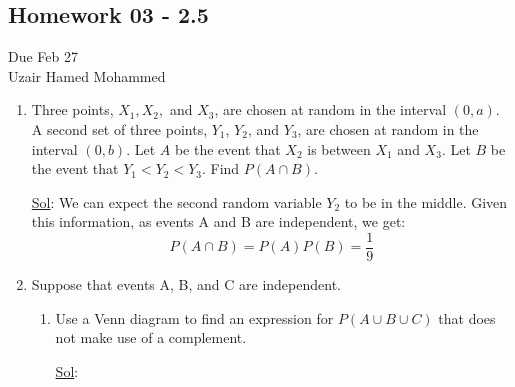 \begin{center}
  \section*{Homework 03 - 2.5}
  Due Feb 27 \\
  Uzair Hamed Mohammed
\end{center}


\begin{enumerate}
  \item[6.] Three points, \(X_1, X_2,\) and \(X_3\), are chosen at random in the
    interval $(0, a)$. A second set of three points, $Y_1$, $Y_2$, and $Y_3$,
    are chosen at random in the interval $(0, b)$. Let $A$ be the event
    that $X_2$ is between $X_1$ and $X_3$. Let $B$ be the event that
    $Y_1 < Y_2 <
    Y_3$. Find $P(A \cap B)$.

    \underline{Sol}: We can expect the second random variable \(Y_2\)
    to be in the middle. Given this information, as events A and B
    are independent, we get:
    \[
      P(A \cap B) = P(A) P(B) = \boxed{\frac{1}{9}}
    \]

  \item[8.] Suppose that events A, B, and C are independent.
    \begin{enumerate}
      \item Use a Venn diagram to find an expression for \(P(A \cup B
        \cup C)\) that does not make use of a complement.

        \underline{Sol}:
        \begin{center}
\end{center}
\end{enumerate}
\end{enumerate}
